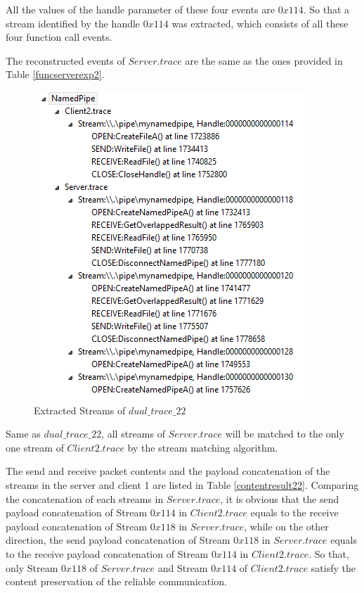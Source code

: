 All the values of the handle parameter of these four events are $0x114$. So that a stream identified by the handle $0x114$ was extracted, which consists of all these four function call events. 

The reconstructed events of $Server.trace$ are the same as the ones provided in Table \ref{funcserverexp2}. 

\begin{figure}[H]
\centerline{\includegraphics[scale=0.55]{Figures/result22_streams}}
 \caption{Extracted Streams of $dual\_trace\_22$}
\label{result22_streams}
\end{figure}

Same as $dual\_trace\_22$, all streams of $Server.trace$ will be matched to the only one stream of $Client2.trace$ by the stream matching algorithm.

The send and receive packet contents and the payload concatenation of the streams in the server and client 1 are listed in Table \ref{contentresult22}. Comparing the concatenation of each streams in $Server.trace$, it is obvious that the send payload concatenation of Stream $0x114$ in $Client2.trace$ equals to the receive payload concatenation of Stream $0x118$ in $Server.trace$, while on the other direction, the send payload concatenation of Stream $0x118$ in $Server.trace$ equals to the receive payload concatenation of Stream $0x114$ in $Client2.trace$. So that, only Stream $0x118$ of $Server.trace$ and Stream $0x114$ of $Client2.trace$ satisfy the content preservation of the reliable communication. 

